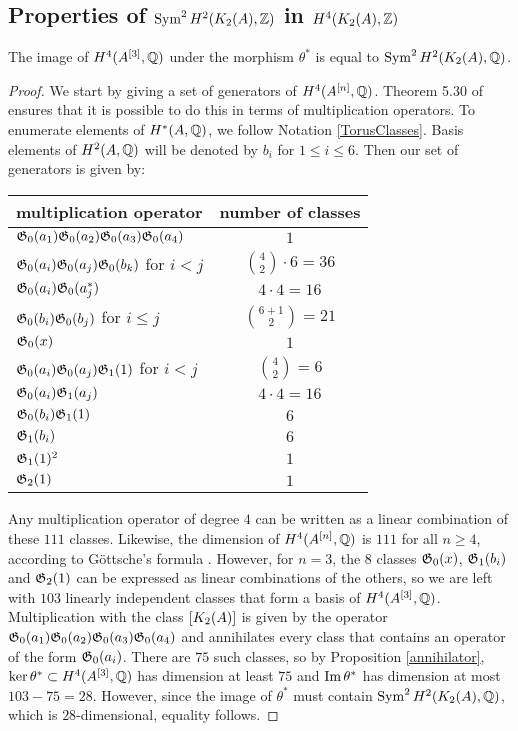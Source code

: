 \subsection{Properties of $\operatorname{Sym}^2H^2(K_2(A),\mathbb{Z})$ in $H^4(K_2(A),\mathbb{Z})$}\label{SyminH4}
\begin{proposition}\label{ImSym}
The image of $H^4(A^{[3]},\mathbb{Q})$ under the morphism $\theta^*$ is equal to $\operatorname{Sym}^2H^2(K_{ 2 }( A ),\mathbb{Q})$.
\end{proposition}
\begin{proof}
We start by giving a set of generators of $H^4(A^{[n]},\mathbb{Q})$. Theorem 5.30 of \cite{LiQinWang} ensures that it is possible to do this in terms of multiplication operators. To enumerate elements of $H^*(A,\mathbb{Q})$, we follow Notation \ref{TorusClasses}. Basis elements of $H^2(A,\mathbb{Q})$ will be denoted by $b_i$ for $1\leq i\leq 6$. Then our set of generators is given by:
\begin{center}
\begin{tabular}{l|c}
multiplication operator & number of classes \\ \hline
$\mathfrak{G}_0(a_1)\mathfrak{G}_0(a_2)\mathfrak{G}_0(a_3)\mathfrak{G}_0(a_4) $  & $1$ \\
$\mathfrak{G}_0(a_i)\mathfrak{G}_0(a_j)\mathfrak{G}_0(b_k)$ for $i<j$  & $\binom{4}{2}\cdot 6 = 36$ \\
$\mathfrak{G}_0(a_i)\mathfrak{G}_0(a_j^*)$ & $4\cdot 4 = 16$ \\
$\mathfrak{G}_0(b_i)\mathfrak{G}_0(b_j)$ for $i\leq j$& $\binom{6+1}{2}= 21$ \\
$\mathfrak{G}_0(x)$ &  $1$  \\ \hline
$\mathfrak{G}_0(a_i)\mathfrak{G}_0(a_j)\mathfrak{G}_1(1)$ for $i<j$ & $\binom{4}{2} = 6$ \\
$\mathfrak{G}_0(a_i)\mathfrak{G}_1(a_j)$ & $4\cdot 4=16$ \\
$\mathfrak{G}_0(b_i)\mathfrak{G}_1(1)$ & $6$ \\
$\mathfrak{G}_1(b_i)$ & $6$ \\
$\mathfrak{G}_1(1)^2 $ & $1$ \\ \hline
$\mathfrak{G}_2(1) $ &$1$
\end{tabular}
\end{center}
Any multiplication operator of degree $4$ can be written as a linear combination of these $111$ classes. Likewise, the dimension of $H^4(A^{[n]},\mathbb{Q})$ is $111$ for all $n\geq 4$, according to G\"ottsche's formula \cite{Gottsche}. However, for $n=3$, the $8$ classes $\mathfrak{G}_0(x)$, $\mathfrak{G}_1(b_i)$ and $\mathfrak{G}_2(1) $ can be expressed as linear combinations of the others, so we are left with $103$ linearly independent classes that form a basis of $H^4(A^{[3]},\mathbb{Q})$. Multiplication with the class $[K_{ 2 }( A )]$ is given by the operator $\mathfrak{G}_0(a_1)\mathfrak{G}_0(a_2)\mathfrak{G}_0(a_3)\mathfrak{G}_0(a_4) $ and annihilates every class that contains an operator of the form $\mathfrak{G}_0(a_i)$. There are $75$ such classes, so by Proposition \ref{annihilator}, $\ker \theta^*\subset H^4(A^{[3]},\mathbb{Q})$ has dimension at least $75$ and $\operatorname{Im}\theta^*$ has dimension at most $103-75=28$. However, since the image of $\theta^*$ must contain $\operatorname{Sym}^2H^2(K_{ 2 }( A ),\mathbb{Q})$, which is $28$-dimensional, equality follows.
\end{proof}


